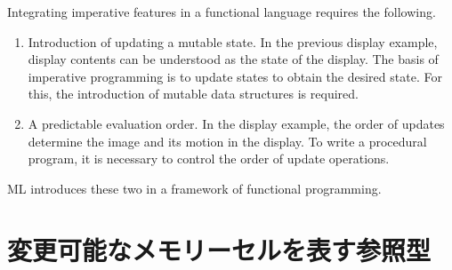 \documentclass{jbook}
\newcommand{\txt}[2]{#1}
\begin{document}
	Integrating imperative features in a functional language
requires the following.
\begin{enumerate}
\item Introduction of updating a mutable state.
	In the previous display example, display contents can be
understood as the state of the display.
	The basis of imperative programming is to update states to
obtain the desired state.
	For this, the introduction of mutable data structures is
required.
\item A predictable evaluation order.
	In the display example, the order of updates determine the image
and its motion in the display.
	To write a procedural program, it is necessary to control the
order of update operations.
\end{enumerate}
	ML introduces these two in a framework of functional programming.
\fi%

\section{
\txt{変更可能なメモリーセルを表す参照型}
    {Mutable memory reference types}}
\label{sec:tutorialRef}
\end{document}
